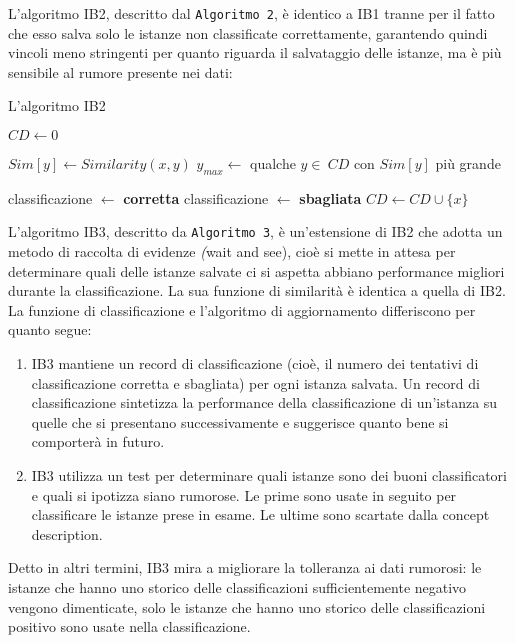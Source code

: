 L'algoritmo IB2, descritto dal \texttt{Algoritmo 2}, è identico a IB1 tranne per il fatto che esso salva solo le istanze non classificate correttamente, garantendo quindi vincoli meno stringenti per quanto riguarda il salvataggio delle istanze, ma è più sensibile al rumore presente nei dati:

\begin{algorithm}[!htb]
\caption{L'algoritmo IB2}
\begin{algorithmic}[1]
	\State $CD \gets 0$
  	
    	\State $Sim[y] \gets Similarity(x, y)$
        \State $y_{max} \gets $ qualche $ y \in \  CD $ con $ Sim[y] $ più grande
    \EndFor
    
    	\State classificazione $\gets$ \textbf{corretta}
    \Else
    	\State classificazione $\gets$ \textbf{sbagliata}
        \State $CD \gets CD \cup \{x\} $
    \EndIf
  \EndFor
\end{algorithmic}
\end{algorithm}

L'algoritmo IB3, descritto da \texttt{Algoritmo 3}, è un'estensione di IB2 che adotta un metodo di raccolta di evidenze \emph(wait and see), cioè si mette in attesa per determinare quali delle istanze salvate ci si aspetta abbiano performance migliori durante la classificazione. La sua funzione di similarità è identica a quella di IB2. La funzione di classificazione e l'algoritmo di aggiornamento differiscono per quanto segue:
\begin{enumerate}
	\item IB3 mantiene un record di classificazione (cioè, il numero dei tentativi di classificazione corretta e sbagliata) per ogni istanza salvata. Un record di classificazione sintetizza la performance della classificazione di un'istanza su quelle che si presentano successivamente e suggerisce quanto bene si comporterà in futuro.
    \item IB3 utilizza un test per determinare quali istanze sono dei buoni classificatori e quali si ipotizza siano rumorose. Le prime sono usate in seguito per classificare le istanze prese in esame. Le ultime sono scartate dalla concept description.
\end{enumerate}

Detto in altri termini, IB3 mira a migliorare la tolleranza ai dati rumorosi: le istanze che hanno uno storico delle classificazioni sufficientemente negativo vengono dimenticate, solo le istanze che hanno uno storico delle classificazioni positivo sono usate nella classificazione.


